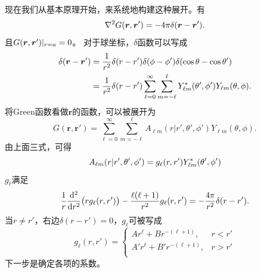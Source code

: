 现在我们从基本原理开始，来系统地构建这种展开。有%
\[
    \laplacian G(\bm r,\bm r') = -4\pi\delta(\bm r - \bm r').
\]
且$\eval{G(\bm r,\bm r')}_{r=a} = 0$。
对于球坐标，$\delta$函数可以写成
\begin{equation}
    \label{eq:ed-spherical-delta-density}
    \begin{aligned}
        \delta(\bm r - \bm r') &= \frac1{r^2}\delta(r - r')\delta(\phi - \phi')\delta(\cos\theta - \cos\theta')\\
        &= \frac1{r^2}\delta(r - r')\sum_{\ell=0}^\infty\sum_{m=-\ell}^\ell Y_{\ell m}\conj(\theta',\phi')Y_{\ell m}(\theta,\phi).
    \end{aligned}
\end{equation}
将Green函数看做$\bm r$的函数，可以被展开为
\[
    G(\bm r,\bm r') = \sum_{\ell=0}^\infty\sum_{m=-\ell}^\ell A_{\ell m}(r|r',\theta',\phi')Y_{\ell m}(\theta,\phi).
\]
由上面三式，可得 
\[
    A_{\ell m}(r|r',\theta',\phi') = g_\ell(r,r')Y_{\ell m}\conj(\theta',\phi')
\]
$g_\ell$满足
\[
    \frac1r\dd[2]r\bigp{rg_\ell(r,r')} - \frac{\ell(\ell + 1)}{r^2}g_\ell(r,r') = -\frac{4\pi}{r^2}\delta(r - r').
\]
当$r \neq r'$，右边$\delta(r - r') = 0$，$g_\ell$可被写成
\[
    g_\ell(r,r') =
    \begin{cases}
        Ar^\ell + Br^{-(\ell+1)},&r < r'\\
        A'r^\ell + B'r^{-(\ell+1)},&r > r'\\
    \end{cases}
\]
下一步是确定各项的系数。
